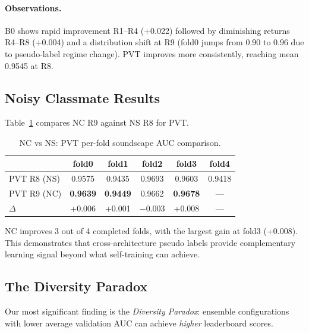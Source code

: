 \documentclass[a4paper]{article}
\begin{document}
\paragraph{Observations.}
B0 shows rapid improvement R1--R4 (+0.022) followed by diminishing returns R4--R8 (+0.004) and a distribution shift at R9 (fold0 jumps from 0.90 to 0.96 due to pseudo-label regime change).
PVT improves more consistently, reaching mean 0.9545 at R8.

\subsection{Noisy Classmate Results}

Table~\ref{tab:nc_vs_ns} compares NC R9 against NS R8 for PVT.

\begin{table}[t]
\centering
\caption{NC vs NS: PVT per-fold soundscape AUC comparison.}
\label{tab:nc_vs_ns}
\small
\begin{tabular}{lccccc}
\toprule
 & fold0 & fold1 & fold2 & fold3 & fold4 \\
\midrule
PVT R8 (NS) & 0.9575 & 0.9435 & 0.9693 & 0.9603 & 0.9418 \\
PVT R9 (NC) & \textbf{0.9639} & \textbf{0.9449} & 0.9662 & \textbf{0.9678} & --- \\
$\Delta$     & +0.006 & +0.001 & $-$0.003 & +0.008 & --- \\
\bottomrule
\end{tabular}
\end{table}

NC improves 3 out of 4 completed folds, with the largest gain at fold3 (+0.008). This demonstrates that cross-architecture pseudo labels provide complementary learning signal beyond what self-training can achieve.

\subsection{The Diversity Paradox}
\label{sec:diversity}

Our most significant finding is the \emph{Diversity Paradox}: ensemble configurations with lower average validation AUC can achieve \emph{higher} leaderboard scores.
\end{document}
